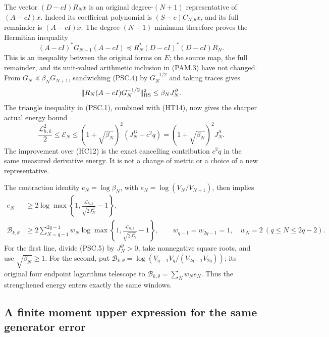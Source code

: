 The vector \((D-cI)R_Nx\) is an original degree-\((N+1)\)
representative of \((A-cI)x\). Indeed its coefficient polynomial
is \((S-c)C_{N,\theta}x\), and its full remainder is
\((A-cI)x\). The degree-\((N+1)\) minimum therefore proves the
Hermitian inequality
\[
 (A-cI)^*G_{N+1}(A-cI)
 \preceq R_N^*(D-cI)^*(D-cI)R_N .
 \tag{PSC.4}\label{eq:psc-minimum}
\]
This is an inequality between the original forms on \(E\);
the source map, the full remainder, and its unit-valued arithmetic
inclusion in (PAM.3) have not changed.
From \(G_N\preceq\beta_NG_{N+1}\), sandwiching (PSC.4) by
\(G_N^{-1/2}\) and taking traces gives
\[
 \|R_N(A-cI)G_N^{-1/2}\|_{\rm HS}^2
 \le\beta_NJ_N^\partial.
\]
The triangle inequality in (PSC.1), combined with (HT14), now gives
the sharper actual energy bound
\[
 \boxed{\quad
 \frac{\mathcal L_{h,k}^2}{2}
 \le\mathcal E_N
 \le(1+\sqrt{\beta_N})^2
           (J_N^D-c^2q)
 =(1+\sqrt{\beta_N})^2J_N^\partial .
 \quad}
 \tag{PSC.5}\label{eq:psc-sharperenergy}
\]
The improvement over (HC12) is the exact cancelling contribution
\(c^2q\) in the same measured derivative energy. It is not a
change of metric or a choice of a new representative.

The contraction identity \(e_N=\log\beta_N\), with
\(e_N=\log(V_N/V_{N+1})\), then implies
\[
 \begin{split}
 e_N&\ge
 2\log\max\left\{1,
       \frac{\mathcal L_{h,k}}{\sqrt{2J_N^\partial}}-1\right\},
 \\
 \mathcal B_{k,\theta}
 &\ge2\sum_{N=q-1}^{2q-1}w_N
 \log\max\left\{1,
       \frac{\mathcal L_{h,k}}{\sqrt{2J_N^\partial}}-1\right\},
 \qquad
 w_{q-1}=w_{2q-1}=1,\quad w_N=2\ (q\le N\le2q-2).
 \end{split}
 \tag{PSC.6}\label{eq:psc-endpoints}
\]
For the first line, divide (PSC.5) by \(J_N^\partial>0\),
take nonnegative square roots, and use \(\sqrt{\beta_N}\ge1\).
For the second, put
\(\mathcal B_{k,\theta}
=\log(V_{q-1}V_q/(V_{2q-1}V_{2q}))\);
its original four endpoint logarithms telescope
to \(\mathcal B_{k,\theta}=\sum_Nw_Ne_N\).
Thus the strengthened energy enters exactly the same windows.

\subsection{A finite moment upper expression for the same generator error}
\label{sec:psc-moments}

